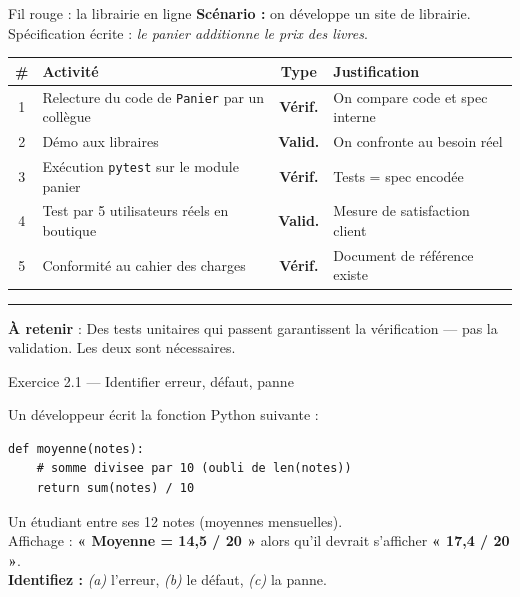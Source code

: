 \documentclass[aspectratio=169,11pt]{beamer}
\newcommand{\takeaway}[1]{%
\vfill\begin{beamercolorbox}[wd=\linewidth,sep=0.4em]{}
\color{accent2}\rule[0.6ex]{1.2em}{1.2pt}\hspace{0.4em}%
\textbf{\color{accent2}\small À retenir} \textcolor{textsoft}{:} %
{\small\color{textmain}#1}
\end{beamercolorbox}}
\begin{document}
\begin{frame}[t]{Fil rouge : la librairie en ligne}
\footnotesize
\textbf{Scénario :} on développe un site de librairie. Spécification écrite : \textit{le panier additionne le prix des livres}.
\vspace{0.4cm}
\begin{tabular}{@{}c p{4.2cm} c p{4.4cm}@{}}
\toprule
\textbf{\#} & \textbf{Activité} & \textbf{Type} & \textbf{Justification} \\
\midrule
1 & Relecture du code de \texttt{Panier} par un collègue
& \textcolor{accent}{\bfseries Vérif.}
& On compare code et spec interne \\
2 & Démo aux libraires
& \textcolor{accent2}{\bfseries Valid.}
& On confronte au besoin réel \\
3 & Exécution \texttt{pytest} sur le module panier
& \textcolor{accent}{\bfseries Vérif.}
& Tests = spec encodée \\
4 & Test par 5 utilisateurs réels en boutique
& \textcolor{accent2}{\bfseries Valid.}
& Mesure de satisfaction client \\
5 & Conformité au cahier des charges
& \textcolor{accent}{\bfseries Vérif.}
& Document de référence existe \\
\bottomrule
\end{tabular}
\takeaway{Des tests unitaires qui passent garantissent la vérification --- pas la validation. Les deux sont nécessaires.}
\end{frame}

\begin{frame}[fragile,t]{Exercice 2.1 --- Identifier erreur, défaut, panne}
\begin{exercice}
Un développeur écrit la fonction Python suivante :
\begin{lstlisting}[style=pythondark]
def moyenne(notes):
    # somme divisee par 10 (oubli de len(notes))
    return sum(notes) / 10
\end{lstlisting}
Un étudiant entre ses 12 notes (moyennes mensuelles).\\
Affichage : \textbf{« Moyenne = 14,5 / 20 »} alors qu'il devrait s'afficher \textbf{« 17,4 / 20 »}.\\[0.3em]
\textbf{Identifiez :} \textit{(a)} l'erreur, \textit{(b)} le défaut, \textit{(c)} la panne.
\end{exercice}
\end{frame}
\end{document}
